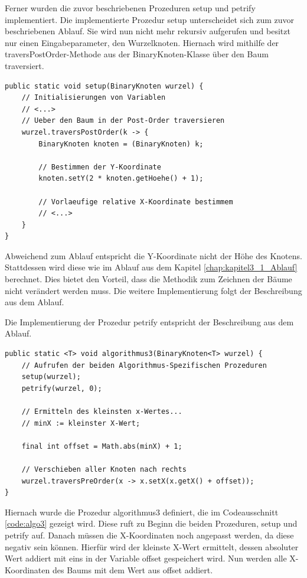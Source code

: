 Ferner wurden die zuvor beschriebenen Prozeduren \glqq setup\grqq{} und \glqq petrify\grqq{} implementiert. Die implementierte Prozedur
\glqq setup\grqq{} unterscheidet sich zum zuvor beschriebenen Ablauf. Sie wird nun nicht mehr rekursiv aufgerufen und besitzt 
nur einen Eingabeparameter, den Wurzelknoten. Hiernach wird mithilfe der \glqq traversPostOrder\grqq{}-Methode aus der 
BinaryKnoten-Klasse über den Baum traversiert.

\begin{lstlisting}[caption=Ausschnitt aus der setup-Prozedur, label=code:algo3_setup]
public static void setup(BinaryKnoten wurzel) {
    // Initialisierungen von Variablen
    // <...>
    // Ueber den Baum in der Post-Order traversieren
    wurzel.traversPostOrder(k -> {
        BinaryKnoten knoten = (BinaryKnoten) k;

        // Bestimmen der Y-Koordinate
        knoten.setY(2 * knoten.getHoehe() + 1);

        // Vorlaeufige relative X-Koordinate bestimmem
        // <...>
    }
}
\end{lstlisting}

Abweichend zum Ablauf entspricht die Y-Koordinate nicht der Höhe des Knotens. Stattdessen wird diese wie im 
Ablauf aus dem Kapitel \ref{chap:kapitel3_1_Ablauf} berechnet. Dies bietet den Vorteil, 
dass die Methodik zum Zeichnen der Bäume nicht verändert werden muss. Die weitere Implementierung folgt 
der Beschreibung aus dem Ablauf.

Die Implementierung der Prozedur \glqq petrify\grqq{} entspricht der Beschreibung aus dem Ablauf.

\begin{lstlisting}[caption=Ausschnitt aus der algorithmus3-Prozedur, label=code:algo3]
public static <T> void algorithmus3(BinaryKnoten<T> wurzel) {
    // Aufrufen der beiden Algorithmus-Spezifischen Prozeduren
    setup(wurzel);
    petrify(wurzel, 0);

    // Ermitteln des kleinsten x-Wertes...
    // minX := kleinster X-Wert;

    final int offset = Math.abs(minX) + 1;

    // Verschieben aller Knoten nach rechts
    wurzel.traversPreOrder(x -> x.setX(x.getX() + offset));
}
\end{lstlisting}

Hiernach wurde die Prozedur \glqq algorithmus3\grqq{} definiert, die im Codeausschnitt \ref{code:algo3} gezeigt wird.
Diese ruft zu Beginn die beiden Prozeduren, 
\glqq setup\grqq{} und \glqq petrify\grqq{} auf. Danach müssen die X-Koordinaten noch angepasst werden, da diese 
negativ sein können. Hierfür wird der kleinste X-Wert ermittelt, dessen absoluter Wert 
addiert mit eins in der Variable \glqq offset\grqq{} gespeichert wird. Nun werden alle X-Koordinaten des 
Baums mit dem Wert aus \glqq offset\grqq{} addiert. 

